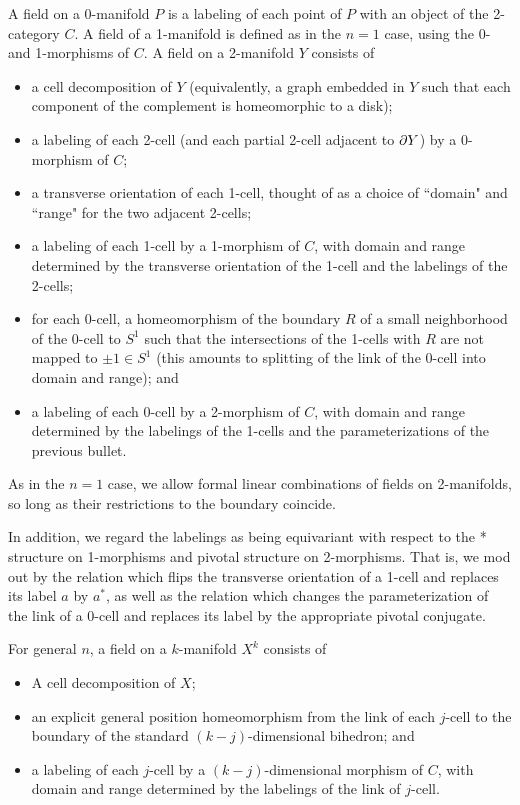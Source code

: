 A field on a 0-manifold $P$ is a labeling of each point of $P$ with
an object of the 2-category $C$.
A field of a 1-manifold is defined as in the $n=1$ case, using the 0- and 1-morphisms of $C$.
A field on a 2-manifold $Y$ consists of
\begin{itemize}
    \item a cell decomposition of $Y$ (equivalently, a graph embedded in $Y$ such
that each component of the complement is homeomorphic to a disk);
    \item a labeling of each 2-cell (and each partial 2-cell adjacent to $\partial Y$)
by a 0-morphism of $C$;
    \item a transverse orientation of each 1-cell, thought of as a choice of
``domain" and ``range" for the two adjacent 2-cells;
    \item a labeling of each 1-cell by a 1-morphism of $C$, with
domain and range determined by the transverse orientation of the 1-cell
and the labelings of the 2-cells;
    \item for each 0-cell, a homeomorphism of the boundary $R$ of a small neighborhood
of the 0-cell to $S^1$ such that the intersections of the 1-cells with $R$ are not mapped
to $\pm 1 \in S^1$
(this amounts to splitting of the link of the 0-cell into domain and range); and
    \item a labeling of each 0-cell by a 2-morphism of $C$, with domain and range
determined by the labelings of the 1-cells and the parameterizations of the previous
bullet.
\end{itemize}

As in the $n=1$ case, we allow formal linear combinations of fields on 2-manifolds, 
so long as their restrictions to the boundary coincide.

In addition, we regard the labelings as being equivariant with respect to the * structure
on 1-morphisms and pivotal structure on 2-morphisms.
That is, we mod out by the relation which flips the transverse orientation of a 1-cell 
and replaces its label $a$ by $a^*$, as well as the relation which changes the parameterization of the link
of a 0-cell and replaces its label by the appropriate pivotal conjugate.

\medskip

For general $n$, a field on a $k$-manifold $X^k$ consists of
\begin{itemize}
    \item A cell decomposition of $X$;
    \item an explicit general position homeomorphism from the link of each $j$-cell
to the boundary of the standard $(k-j)$-dimensional bihedron; and
    \item a labeling of each $j$-cell by a $(k-j)$-dimensional morphism of $C$, with
domain and range determined by the labelings of the link of $j$-cell.
\end{itemize}


